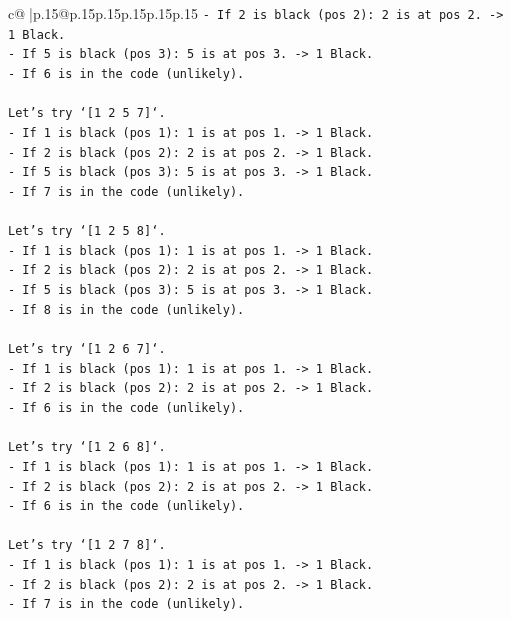 \documentclass{article}
\begin{document}
{\begin{supertabular}{c@{$\;$}|p{.15\linewidth}@{}p{.15\linewidth}p{.15\linewidth}p{.15\linewidth}p{.15\linewidth}p{.15\linewidth}}
{{{\texttt{{-} If 2 is black (pos 2): 2 is at pos 2. {-}> 1 Black.} \\
\texttt{{-} If 5 is black (pos 3): 5 is at pos 3. {-}> 1 Black.} \\
\texttt{{-} If 6 is in the code (unlikely).} \\
\\ 
\texttt{Let's try `{[}1 2 5 7{]}`.} \\
\texttt{{-} If 1 is black (pos 1): 1 is at pos 1. {-}> 1 Black.} \\
\texttt{{-} If 2 is black (pos 2): 2 is at pos 2. {-}> 1 Black.} \\
\texttt{{-} If 5 is black (pos 3): 5 is at pos 3. {-}> 1 Black.} \\
\texttt{{-} If 7 is in the code (unlikely).} \\
\\ 
\texttt{Let's try `{[}1 2 5 8{]}`.} \\
\texttt{{-} If 1 is black (pos 1): 1 is at pos 1. {-}> 1 Black.} \\
\texttt{{-} If 2 is black (pos 2): 2 is at pos 2. {-}> 1 Black.} \\
\texttt{{-} If 5 is black (pos 3): 5 is at pos 3. {-}> 1 Black.} \\
\texttt{{-} If 8 is in the code (unlikely).} \\
\\ 
\texttt{Let's try `{[}1 2 6 7{]}`.} \\
\texttt{{-} If 1 is black (pos 1): 1 is at pos 1. {-}> 1 Black.} \\
\texttt{{-} If 2 is black (pos 2): 2 is at pos 2. {-}> 1 Black.} \\
\texttt{{-} If 6 is in the code (unlikely).} \\
\\ 
\texttt{Let's try `{[}1 2 6 8{]}`.} \\
\texttt{{-} If 1 is black (pos 1): 1 is at pos 1. {-}> 1 Black.} \\
\texttt{{-} If 2 is black (pos 2): 2 is at pos 2. {-}> 1 Black.} \\
\texttt{{-} If 6 is in the code (unlikely).} \\
\\ 
\texttt{Let's try `{[}1 2 7 8{]}`.} \\
\texttt{{-} If 1 is black (pos 1): 1 is at pos 1. {-}> 1 Black.} \\
\texttt{{-} If 2 is black (pos 2): 2 is at pos 2. {-}> 1 Black.} \\
\texttt{{-} If 7 is in the code (unlikely).} \\
}}}
\end{supertabular}}
\end{document}
